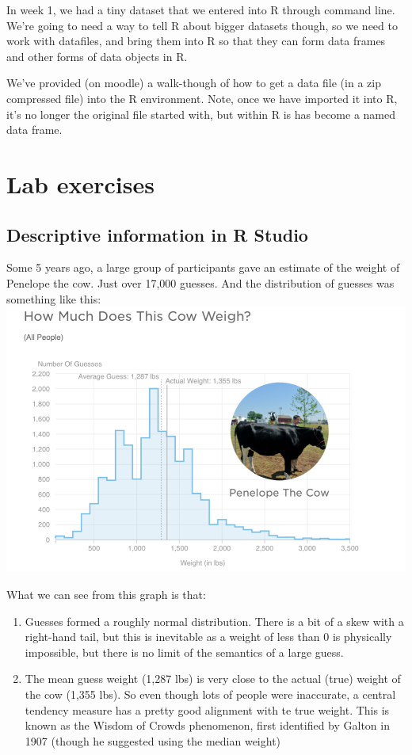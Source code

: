 \documentclass[
]{book}
\providecommand{\tightlist}{%
  \setlength{\itemsep}{0pt}\setlength{\parskip}{0pt}}
\begin{document}
In week 1, we had a tiny dataset that we entered into R through command line. We're going to need a way to tell R about bigger datasets though, so we need to work with datafiles, and bring them into R so that they can form data frames and other forms of data objects in R.

We've provided (on moodle) a walk-though of how to get a data file (in a zip compressed file) into the R environment. Note, once we have imported it into R, it's no longer the original file started with, but within R is has become a named data frame.

\hypertarget{lab-exercises}{%
\section{Lab exercises}\label{lab-exercises}}

\hypertarget{descriptive-information-in-r-studio}{%
\subsection{Descriptive information in R Studio}\label{descriptive-information-in-r-studio}}

Some 5 years ago, a large group of participants gave an estimate of the weight of Penelope the cow. Just over 17,000 guesses. And the distribution of guesses was something like this: \includegraphics{files/Week_2/penelope.png}

What we can see from this graph is that:

\begin{enumerate}
\def\labelenumi{\arabic{enumi}.}
\tightlist
\item
  Guesses formed a roughly normal distribution. There is a bit of a skew with a right-hand tail, but this is inevitable as a weight of less than 0 is physically impossible, but there is no limit of the semantics of a large guess.
\item
  The mean guess weight (1,287 lbs) is very close to the actual (true) weight of the cow (1,355 lbs). So even though lots of people were inaccurate, a central tendency measure has a pretty good alignment with te true weight. This is known as the Wisdom of Crowds phenomenon, first identified by Galton in 1907 (though he suggested using the median weight)
\end{enumerate}
\end{document}
